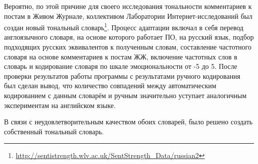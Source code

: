Вероятно, по этой причине для своего исследования тональности комментариев к постам в Живом Журнале, коллективом Лаборатории Интернет-исследований был создан новый тональный словарь\footnote{\href{http://sentistrength.wlv.ac.uk/SentStrength\_Data/russian2}{http://sentistrength.wlv.ac.uk/SentStrength\_Data/russian2}}\cite{hse_sentistrength}. Процесс адаптации включал в себя перевод англоязычного словаря, на основе которого работает ПО, на русский язык, подбор подходящих русских эквивалентов к полученным словам, составление частотного словаря на основе комментариев к постам ЖЖ, включение частотных слов в словарь и кодирование словаря по шкале эмоциональности от -5 до 5. После проверки результатов работы программы с результатами ручного кодирования был сделан вывод, что количество совпадений между автоматическим кодированием с данным словарём и ручным значительно уступает аналогичным экспериментам на английском языке.

В связи с неудовлетворительным качеством обоих словарей, было решено создать собственный тональный словарь.
\clearpage